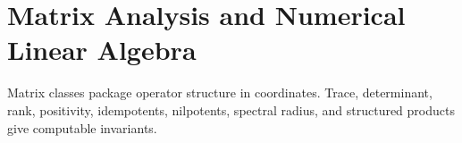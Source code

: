 \part{Matrix Analysis and Numerical Linear Algebra}

%

Matrix classes package operator structure in coordinates. Trace, determinant, rank, positivity, idempotents, nilpotents, spectral radius, and structured products give computable invariants.








